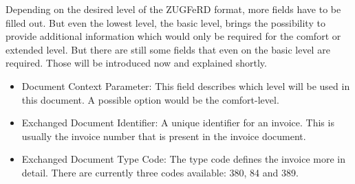 Depending on the desired level of the ZUGFeRD format, more fields have to be filled out. But even the lowest level, the basic level, brings the possibility to provide additional information which would only be required for the comfort or extended level. But there are still some fields that even on the basic level are required. Those will be introduced now and explained shortly.
\begin{itemize}
	\item Document Context Parameter: This field describes which level will be used in this document. A possible option would be the comfort-level.
	\item Exchanged Document Identifier: A unique identifier for an invoice. This is usually the invoice number that is present in the invoice document.
	\item Exchanged Document Type Code: The type code defines the invoice more in detail. There are currently three codes available: 380, 84 and 389.
	

\end{itemize}
